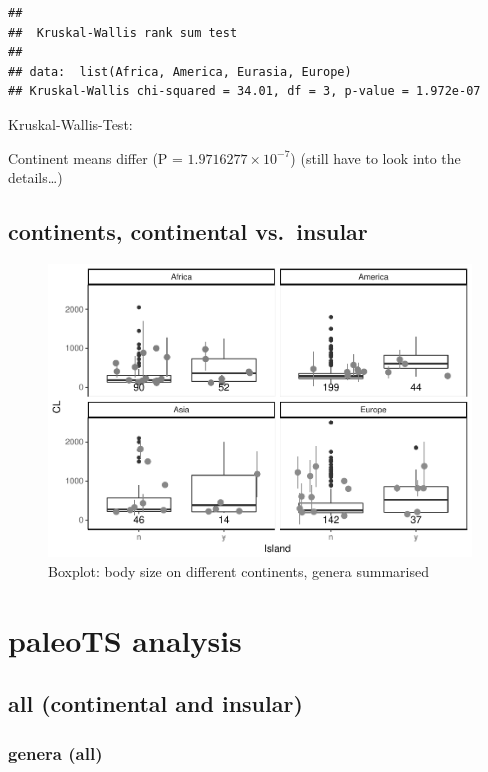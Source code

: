 \documentclass[]{article}
\begin{document}
\begin{verbatim}
## 
##  Kruskal-Wallis rank sum test
## 
## data:  list(Africa, America, Eurasia, Europe)
## Kruskal-Wallis chi-squared = 34.01, df = 3, p-value = 1.972e-07
\end{verbatim}

Kruskal-Wallis-Test:

Continent means differ (P = \(1.9716277\times 10^{-7}\)) (still have to
look into the details\ldots{})

\newpage

\subsection{continents, continental
vs.~insular}\label{continents-continental-vs.insular}

\begin{figure}[htbp]
\centering
\includegraphics{MA_JJ_files/figure-latex/BPConCI-1.pdf}
\caption{Boxplot: body size on different continents, genera summarised}
\end{figure}

\newpage

\section{paleoTS analysis}\label{paleots-analysis}

\subsection{all (continental and
insular)}\label{all-continental-and-insular}

\subsubsection{genera (all)}\label{genera-all}
\end{document}
